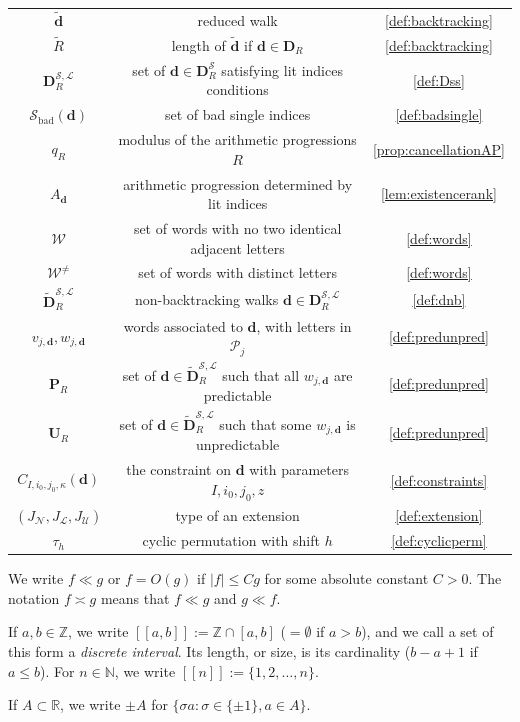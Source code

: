 \documentclass[11pt]{amsart}
\theoremstyle{definition}
\renewcommand{\leq}{\leqslant}
\newcommand{\interval}[2]{[\![#1,#2]\!] }
\newcommand{\sinterval}[1]{[\![#1]\!] }
\newcommand{\R}{\mathbb{R}}
\newcommand{\Z}{\mathbb{Z}}
\newcommand{\primes}{\mathcal{P}}
\renewcommand{\d}{\boldsymbol{d}}
\newcommand{\pred}{\mathbf{P}_{\!\tupsize}}
\newcommand{\unpred}{\mathbf{U}_{\!\tupsize}}
\newcommand{\progression}{A_{\d}}
\newcommand{\word}{\mathcal{W}}
\newcommand{\lit}{\mathcal{L}}
\newcommand{\unlit}{\mathcal{U}}
\newcommand{\s}{\mathcal{S}}
\newcommand{\new}{\mathcal{N}}
\newcommand{\fancyD}{\mathbf{D}}
\newcommand{\Dsfmix}[1]{\fancyD_{\!#1}}
\newcommand{\DsR}{\fancyD^{\s}_{\!\tupsize}}
\newcommand{\DssR}{\fancyD^{\s,\lit}_{\!\tupsize}}
\newcommand{\Dnb}{\widetilde{\fancyD}^{\s,\lit}_{\!\tupsize}}
\newcommand{\modulus}{q}
\newcommand{\Redd}{\widetilde{\d}}
\newcommand{\kbad}{\s_{\mathrm{bad}}(\d)}
\newcommand{\tupsize}{R}
\newcommand{\cshift}{\kappa}
\begin{document}
\begin{center}
{\begin{tabular}{c|c|c}
$\Redd$ & reduced walk & \cref{def:backtracking}\\
$\widetilde{\tupsize}$ & length of $\Redd$ if $\d \in \Dsfmix{\tupsize}$ & \cref{def:backtracking}\\
$\DssR$ & set of $\d \in \DsR$ satisfying lit indices conditions & \cref{def:Dss}\\
$\kbad$ & set of bad single indices & \cref{def:badsingle}\\
$\modulus_{R}$ & modulus of the arithmetic progressions $R$ & \cref{prop:cancellationAP} \\
$\progression$ & arithmetic progression determined by lit indices & \cref{lem:existencerank}\\
$\word$ & set of words with no two identical adjacent letters & \cref{def:words}\\
$\word^{\neq}$ & set of words with distinct letters & \cref{def:words}\\
$\Dnb$ & non-backtracking walks $\d\in \DssR$ & \cref{def:dnb}\\
$v_{j,\d}, w_{j,\d}$ & words associated to $\d$, with letters in $\primes_j$ & \cref{def:predunpred}\\
$\pred$ & set of $\d\in \Dnb$ such that all $w_{j,\d}$ are predictable & \cref{def:predunpred}\\
$\unpred$ & set of $\d\in \Dnb$ such that some $w_{j,\d}$ is unpredictable & \cref{def:predunpred}\\
$C_{I, i_0,j_0,\cshift}(\d)$ & the constraint on $\d$ with parameters $I, i_0,j_0,z$ & \cref{def:constraints}\\
$(J_{\new}, J_{\lit}, J_{\unlit})$ & type of an extension & \cref{def:extension}\\
$\tau_h$ & cyclic permutation with shift $h$ & \cref{def:cyclicperm}\\
\end{tabular}}
\end{center}


We write $f\ll g$ or $f = O(g)$ if $|f| \leq Cg$ for some absolute constant $C>0$. The notation $f\asymp g$ means that $f\ll g$ and $g\ll f$. 

If $a,b\in \Z$, we write $\interval{a}{b} := \Z\cap [a,b]$ ($=\emptyset$ if $a>b$), and we call a set of this form a \emph{discrete interval}. Its length, or size, is its cardinality ($b-a+1$ if $a\leq b$). For $n\in \mathbb{N}$, we write $\sinterval{n} := \{1,2,\ldots, n\}$. 

If $A\subset \R$, we write $\pm A$ for $\{\sigma a: \sigma \in \{\pm1\}, a\in A\}$. 
\end{document}

